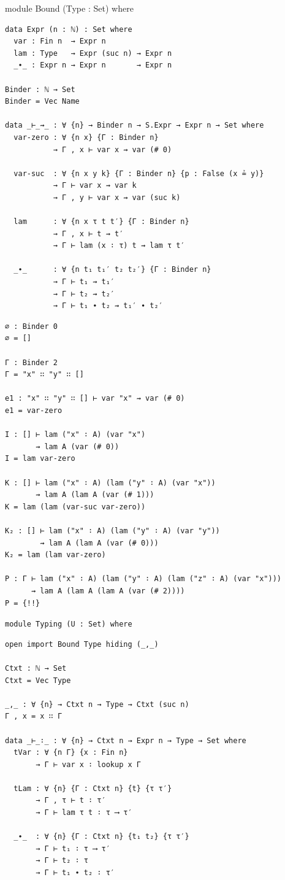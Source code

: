 \documentclass[10pt, xetex, hyperref={pdfpagelabels=false}]{beamer}
\begin{document}
\begin{frame}[fragile]{module Bound (Type : Set) where}
\begin{verbatim}
data Expr (n : ℕ) : Set where
  var : Fin n  → Expr n
  lam : Type   → Expr (suc n) → Expr n
  _∙_ : Expr n → Expr n       → Expr n

Binder : ℕ → Set
Binder = Vec Name

data _⊢_⇝_ : ∀ {n} → Binder n → S.Expr → Expr n → Set where
  var-zero : ∀ {n x} {Γ : Binder n}
           → Γ , x ⊢ var x ⇝ var (# 0)

  var-suc  : ∀ {n x y k} {Γ : Binder n} {p : False (x ≟ y)}
           → Γ ⊢ var x ⇝ var k
           → Γ , y ⊢ var x ⇝ var (suc k)

  lam      : ∀ {n x τ t t′} {Γ : Binder n}
           → Γ , x ⊢ t ⇝ t′
           → Γ ⊢ lam (x ∶ τ) t ⇝ lam τ t′

  _∙_      : ∀ {n t₁ t₁′ t₂ t₂′} {Γ : Binder n}
           → Γ ⊢ t₁ ⇝ t₁′
           → Γ ⊢ t₂ ⇝ t₂′
           → Γ ⊢ t₁ ∙ t₂ ⇝ t₁′ ∙ t₂′
\end{verbatim}
\end{frame}

\begin{frame}[fragile]
\begin{verbatim}
∅ : Binder 0
∅ = []

Γ : Binder 2
Γ = "x" ∷ "y" ∷ []

e1 : "x" ∷ "y" ∷ [] ⊢ var "x" ⇝ var (# 0)
e1 = var-zero

I : [] ⊢ lam ("x" ∶ A) (var "x")
       ⇝ lam A (var (# 0))
I = lam var-zero

K : [] ⊢ lam ("x" ∶ A) (lam ("y" ∶ A) (var "x"))
       ⇝ lam A (lam A (var (# 1)))
K = lam (lam (var-suc var-zero))

K₂ : [] ⊢ lam ("x" ∶ A) (lam ("y" ∶ A) (var "y"))
        ⇝ lam A (lam A (var (# 0)))
K₂ = lam (lam var-zero)

P : Γ ⊢ lam ("x" ∶ A) (lam ("y" ∶ A) (lam ("z" ∶ A) (var "x")))
      ⇝ lam A (lam A (lam A (var (# 2))))
P = {!!}
\end{verbatim}
\end{frame}

\begin{frame}[fragile]{\texttt{module Typing (U : Set) where}}
\begin{verbatim}
open import Bound Type hiding (_,_)

Ctxt : ℕ → Set
Ctxt = Vec Type

_,_ : ∀ {n} → Ctxt n → Type → Ctxt (suc n)
Γ , x = x ∷ Γ

data _⊢_∶_ : ∀ {n} → Ctxt n → Expr n → Type → Set where
  tVar : ∀ {n Γ} {x : Fin n}
       → Γ ⊢ var x ∶ lookup x Γ

  tLam : ∀ {n} {Γ : Ctxt n} {t} {τ τ′}
       → Γ , τ ⊢ t ∶ τ′
       → Γ ⊢ lam τ t ∶ τ ⟶ τ′

  _∙_  : ∀ {n} {Γ : Ctxt n} {t₁ t₂} {τ τ′}
       → Γ ⊢ t₁ ∶ τ ⟶ τ′
       → Γ ⊢ t₂ ∶ τ
       → Γ ⊢ t₁ ∙ t₂ ∶ τ′
\end{verbatim}
\end{frame}

\end{document}
